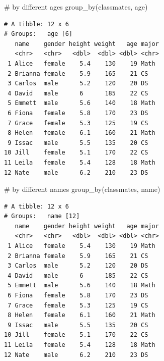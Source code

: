 \documentclass[
  letterpaper,
  DIV=11,
  numbers=noendperiod]{scrreprt}
\newenvironment{Shaded}{\begin{snugshade}}{\end{snugshade}}
\newcommand{\CommentTok}[1]{\textcolor[rgb]{0.37,0.37,0.37}{#1}}
\newcommand{\FunctionTok}[1]{\textcolor[rgb]{0.28,0.35,0.67}{#1}}
\newcommand{\NormalTok}[1]{\textcolor[rgb]{0.00,0.23,0.31}{#1}}
\begin{document}
\begin{tcolorbox}[enhanced jigsaw, colbacktitle=quarto-callout-tip-color!10!white, opacitybacktitle=0.6, breakable, left=2mm, leftrule=.75mm, toprule=.15mm, toptitle=1mm, bottomtitle=1mm, colframe=quarto-callout-tip-color-frame, opacityback=0, coltitle=black, arc=.35mm, titlerule=0mm, colback=white, bottomrule=.15mm, title=\textcolor{quarto-callout-tip-color}{\faLightbulb}\hspace{0.5em}{Answer}, rightrule=.15mm]

\begin{Shaded}
\begin{Highlighting}[]
\CommentTok{\# by different ages}
\FunctionTok{group\_by}\NormalTok{(classmates, age)}
\end{Highlighting}
\end{Shaded}

\begin{verbatim}
# A tibble: 12 x 6
# Groups:   age [6]
   name    gender height weight   age major
   <chr>   <chr>   <dbl>  <dbl> <dbl> <chr>
 1 Alice   female    5.4    130    19 Math 
 2 Brianna female    5.9    165    21 CS   
 3 Carlos  male      5.2    120    20 DS   
 4 David   male      6      185    22 CS   
 5 Emmett  male      5.6    140    18 Math 
 6 Fiona   female    5.8    170    23 DS   
 7 Grace   female    5.3    125    19 CS   
 8 Helen   female    6.1    160    21 Math 
 9 Issac   male      5.5    135    20 CS   
10 Jill    female    5.1    170    22 CS   
11 Leila   female    5.4    128    18 Math 
12 Nate    male      6.2    210    23 DS   
\end{verbatim}

\begin{Shaded}
\begin{Highlighting}[]
\CommentTok{\# by different names}
\FunctionTok{group\_by}\NormalTok{(classmates, name)}
\end{Highlighting}
\end{Shaded}

\begin{verbatim}
# A tibble: 12 x 6
# Groups:   name [12]
   name    gender height weight   age major
   <chr>   <chr>   <dbl>  <dbl> <dbl> <chr>
 1 Alice   female    5.4    130    19 Math 
 2 Brianna female    5.9    165    21 CS   
 3 Carlos  male      5.2    120    20 DS   
 4 David   male      6      185    22 CS   
 5 Emmett  male      5.6    140    18 Math 
 6 Fiona   female    5.8    170    23 DS   
 7 Grace   female    5.3    125    19 CS   
 8 Helen   female    6.1    160    21 Math 
 9 Issac   male      5.5    135    20 CS   
10 Jill    female    5.1    170    22 CS   
11 Leila   female    5.4    128    18 Math 
12 Nate    male      6.2    210    23 DS   
\end{verbatim}

\end{tcolorbox}
\end{document}
